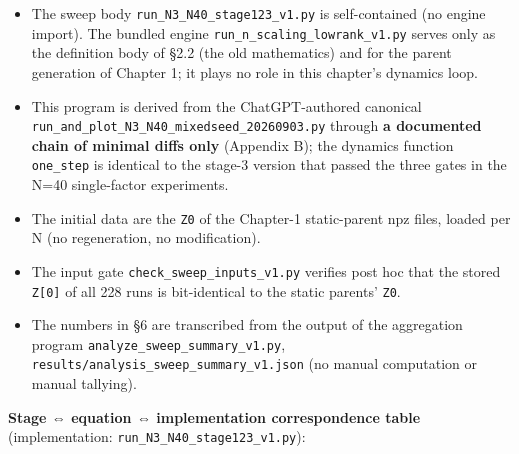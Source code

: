 \documentclass[
  a4paper,
]{ltjsarticle}
\providecommand{\tightlist}{%
  \setlength{\itemsep}{0pt}\setlength{\parskip}{0pt}}
\begin{document}
\begin{itemize}
\tightlist
\item
  The sweep body \texttt{run\_N3\_N40\_stage123\_v1.py} is
  self-contained (no engine import). The bundled engine
  \texttt{run\_n\_scaling\_lowrank\_v1.py} serves only as the definition
  body of §2.2 (the old mathematics) and for the parent generation of
  Chapter 1; it plays no role in this chapter's dynamics loop.
\item
  This program is derived from the ChatGPT-authored canonical
  \texttt{run\_and\_plot\_N3\_N40\_mixedseed\_20260903.py} through
  \textbf{a documented chain of minimal diffs only} (Appendix B); the
  dynamics function \texttt{one\_step} is identical to the stage-3
  version that passed the three gates in the N=40 single-factor
  experiments.
\item
  The initial data are the \texttt{Z0} of the Chapter-1 static-parent
  npz files, loaded per N (no regeneration, no modification).
\item
  The input gate \texttt{check\_sweep\_inputs\_v1.py} verifies post hoc
  that the stored \texttt{Z{[}0{]}} of all 228 runs is bit-identical to
  the static parents' \texttt{Z0}.
\item
  The numbers in §6 are transcribed from the output of the aggregation
  program \texttt{analyze\_sweep\_summary\_v1.py},
  \texttt{results/analysis\_sweep\_summary\_v1.json} (no manual
  computation or manual tallying).
\end{itemize}

\textbf{Stage ⇔ equation ⇔ implementation correspondence table}
(implementation: \texttt{run\_N3\_N40\_stage123\_v1.py}):
\end{document}
